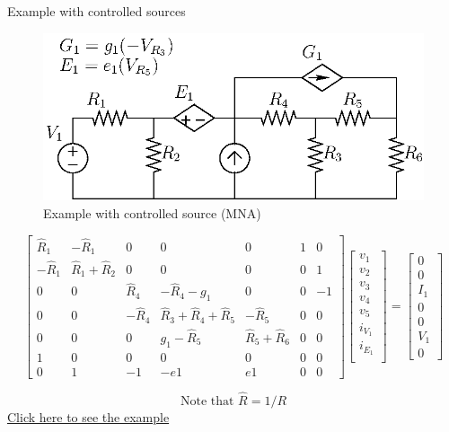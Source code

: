 \documentclass{beamer}
\begin{document}
\begin{frame}
\begin{block}{Example with controlled sources}
\begin{figure}[!ht]
\begin{center}
\includegraphics[scale=0.6]{../figures/linearckt.eps}
\caption{ \scriptsize Example with controlled source (MNA)} \label{modifiedfig}
\end{center}
\end{figure}
\begin{tiny}
$$\left[
\begin{array}{ccccccc}
\widehat{R}_{1} & -\widehat{R}_{1} & 0 & 0 & 0 & 1 & 0 \\
-\widehat{R}_{1} & \widehat{R}_{1}+\widehat{R}_{2} & 0 & 0 & 0 & 0 &1\\
0 & 0& \widehat{R}_{4} & -\widehat{R}_{4}-g_1 & 0 & 0 & -1  \\
0 & 0& -\widehat{R}_{4} & \widehat{R}_{3}+ \widehat{R}_{4}+\widehat{R}_{5} &-\widehat{R}_{5}  & 0 & 0  \\
0 & 0& 0 &g_1-\widehat{R}_{5} & \widehat{R}_{5}+\widehat{R}_{6} & 0 & 0   \\
1 & 0 & 0 & 0 & 0 &0 &0\\
0 & 1 & -1 &-e1 &e1 &0 & 0
\end{array}
\right] \left[
\begin{array}{c}
v_{1}\\
v_{2}\\
v_{3}\\
v_{4}\\
v_{5}\\
i_{V_1}\\
i_{E_1}\\
\end{array}
\right]= \left[
\begin{array}{c}
0\\
0\\
I_1\\
0\\
0\\
V_{1}\\
0
\end{array}
\right]$$
\end{tiny}
\tiny $$\mbox{Note that } \widehat{R}=1/R$$
\tiny \href{run:../../LPCSim_1.0/ckt/linear1.ckt}{\color{red} Click here to see the example}
\end{block}
\end{frame}
\end{document}
